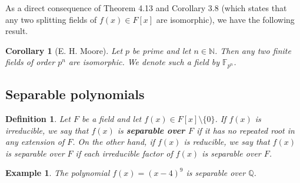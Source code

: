 \documentclass[10pt]{article}
\newcommand{\N}{\mathbb{N}}
\newcommand{\Q}{\mathbb{Q}}
\theoremstyle{newstyle}
\newtheorem{cor}[thm]{Corollary}
\newtheorem{defn}[thm]{Definition}
\newtheorem{exmp}[thm]{Example}
\begin{document}
As a direct consequence of Theorem 4.13 and Corollary 3.8 (which states that any two splitting 
fields of $f(x) \in F[x]$ are isomorphic), we have the following result. 

\begin{cor}[E. H. Moore]
Let $p$ be prime and let $n \in \N$. Then any two finite fields of order $p^n$ are 
isomorphic. We denote such a field by $\mathbb{F}_{p^n}$. 
\end{cor}

\subsection{Separable polynomials}

\begin{defn}
Let $F$ be a field and let $f(x) \in F[x] \setminus \{0\}$. If $f(x)$ is irreducible, 
we say that $f(x)$ is {\bf separable over $F$} if it has no repeated root in 
any extension of $F$. On the other hand, if $f(x)$ is reducible, we say that 
$f(x)$ is separable over $F$ if each irreducible factor of $f(x)$ is separable 
over $F$. 
\end{defn}

\begin{exmp}
The polynomial $f(x) = (x-4)^9$ is separable over $\Q$. 
\end{exmp}
\end{document}
